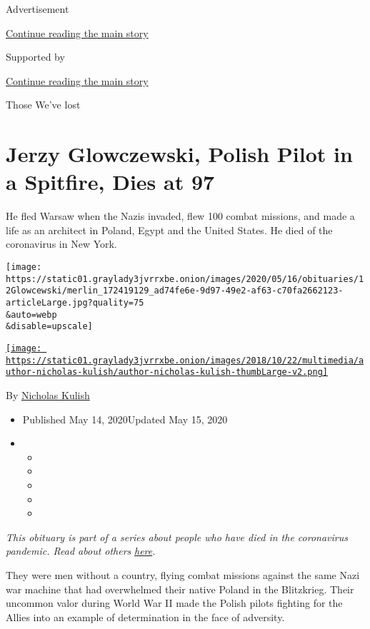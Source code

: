 Advertisement

\protect\hyperlink{after-top}{Continue reading the main story}

Supported by

\protect\hyperlink{after-sponsor}{Continue reading the main story}

Those We've lost

\hypertarget{jerzy-glowczewski-polish-pilot-in-a-spitfire-dies-at-97}{%
\section{Jerzy Glowczewski, Polish Pilot in a Spitfire, Dies at
97}\label{jerzy-glowczewski-polish-pilot-in-a-spitfire-dies-at-97}}

He fled Warsaw when the Nazis invaded, flew 100 combat missions, and
made a life as an architect in Poland, Egypt and the United States. He
died of the coronavirus in New York.

\texttt{[image: https://static01.graylady3jvrrxbe.onion/images/2020/05/16/obituaries/12Glowcewski/merlin\_172419129\_ad74fe6e-9d97-49e2-af63-c70fa2662123-articleLarge.jpg?quality=75\\\&auto=webp\\\&disable=upscale]}

\href{https://www.nytimes3xbfgragh.onion/by/nicholas-kulish}{\texttt{[image: https://static01.graylady3jvrrxbe.onion/images/2018/10/22/multimedia/author-nicholas-kulish/author-nicholas-kulish-thumbLarge-v2.png]}}

By \href{https://www.nytimes3xbfgragh.onion/by/nicholas-kulish}{Nicholas
Kulish}

\begin{itemize}
\item
  Published May 14, 2020Updated May 15, 2020
\item
  \begin{itemize}
  \item
  \item
  \item
  \item
  \item
  \end{itemize}
\end{itemize}

\emph{This obituary is part of a series about people who have died in
the coronavirus pandemic. Read about others}
\href{https://www.nytimes3xbfgragh.onion/series/people-who-have-died-of-the-coronavirus}{\emph{here}}\emph{.}

They were men without a country, flying combat missions against the same
Nazi war machine that had overwhelmed their native Poland in the
Blitzkrieg. Their uncommon valor during World War II made the Polish
pilots fighting for the Allies into an example of determination in the
face of adversity.

